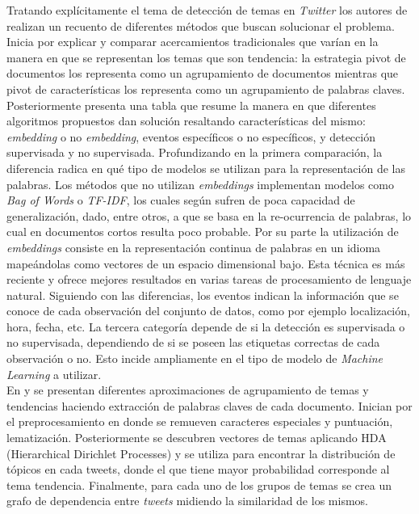 Tratando explícitamente el tema de detección de temas en \textit{Twitter} los autores de  \cite{ReviewApproachesTopcicDetection} realizan un recuento de diferentes métodos que buscan solucionar el problema. Inicia por explicar y comparar acercamientos tradicionales que varían en la manera en que se representan los temas que son tendencia: la estrategia pivot de documentos los representa como un agrupamiento de documentos mientras que pivot de características los representa como un agrupamiento de palabras claves.\\

Posteriormente presenta una tabla que resume la manera en que diferentes algoritmos propuestos dan solución resaltando características del mismo: \textit{embedding} o no \textit{embedding}, eventos específicos o no específicos, y detección supervisada y no supervisada. Profundizando en la primera comparación, la diferencia radica en qué tipo de modelos se utilizan para la representación de las palabras. Los métodos que no utilizan \textit{embeddings} implementan modelos como \textit{Bag of Words} o \textit{TF-IDF}, los cuales según \cite{ReviewApproachesTopcicDetection} sufren de poca capacidad de generalización, dado, entre otros, a que se basa en la re-ocurrencia de palabras, lo cual en documentos cortos resulta poco probable. Por su parte la utilización de \textit{embeddings} consiste en la representación continua de palabras en un idioma mapeándolas como vectores de un espacio dimensional bajo. Esta técnica es más reciente y ofrece mejores resultados en varias tareas de procesamiento de lenguaje natural. Siguiendo con las diferencias, los eventos indican la información que se conoce de cada observación del conjunto de datos, como por ejemplo localización, hora, fecha, etc. La tercera categoría depende de si la detección es supervisada o no supervisada, dependiendo de si se poseen las etiquetas correctas de cada observación o no. Esto incide ampliamente en el tipo de modelo de \textit{Machine Learning} a utilizar.\\

En \cite{TrendTopicsDetectionFromTwitter} y \cite{FuzzyIncrementalTopicDetection} se presentan diferentes aproximaciones de agrupamiento de temas y tendencias haciendo extracción de palabras claves de cada documento. Inician por el preprocesamiento en donde se remueven caracteres especiales y puntuación, lematización. Posteriormente se descubren vectores de temas aplicando HDA (Hierarchical Dirichlet Processes) y se utiliza para encontrar la distribución de tópicos en cada tweets, donde el que tiene mayor probabilidad corresponde al tema tendencia. Finalmente, para cada uno de los grupos de temas se crea un grafo de dependencia entre \textit{tweets} midiendo la similaridad de los mismos.\\

